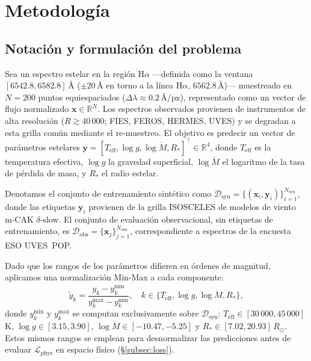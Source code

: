 \documentclass[sigconf,ACM]{acmart}
\begin{document}
\section{Metodología}
\label{sec:metodologia}

\subsection{Notación y formulación del problema}
\label{subsec:formalizacion}

Sea un espectro estelar en la región H$\alpha$ ---definida como la ventana $[6542.8, 6582.8]$\,Å (${\pm}20$\,Å en torno a la línea H$\alpha$, $6562.8$\,Å)--- muestreado en $N=200$ puntos equiespaciados ($\Delta\lambda\approx0.2$\,Å/px), representado como un vector de flujo normalizado $\mathbf{x} \in \mathbb{R}^{N}$. Los espectros observados provienen de instrumentos de alta resolución ($R\gtrsim40\,000$; FIES, FEROS, HERMES, UVES) y se degradan a esta grilla común mediante el re-muestreo. El objetivo es predecir un vector de parámetros estelares $\mathbf{y} = [T_{\mathrm{eff}}, \log g, \log \dot{M}, R_{*}]^{\top} \in \mathbb{R}^{4}$, donde $T_{\mathrm{eff}}$ es la temperatura efectiva, $\log g$ la gravedad superficial, $\log \dot{M}$ el logaritmo de la tasa de pérdida de masa, y $R_{*}$ el radio estelar.

Denotamos el conjunto de entrenamiento sintético como $\mathcal{D}_{\mathrm{syn}} = \{(\mathbf{x}_i, \mathbf{y}_i)\}_{i=1}^{N_{\mathrm{syn}}}$, donde las etiquetas $\mathbf{y}_i$ provienen de la grilla ISOSCELES de modelos de viento m-CAK $\delta$-slow. El conjunto de evaluación observacional, sin etiquetas de entrenamiento, es $\mathcal{D}_{\mathrm{obs}} = \{\mathbf{x}_j\}_{j=1}^{N_{\mathrm{obs}}}$, correspondiente a espectros de la encuesta ESO UVES~POP.

Dado que los rangos de los parámetros difieren en órdenes de magnitud, aplicamos una normalización Min-Max a cada componente:
\begin{equation}
  \tilde{y}_k = \frac{y_k - y_k^{\min}}{y_k^{\max} - y_k^{\min}}, \quad k \in \{T_{\mathrm{eff}}, \log g, \log \dot{M}, R_{*}\},
  \label{eq:minmax}
\end{equation}
donde $y_k^{\min}$ y $y_k^{\max}$ se computan exclusivamente sobre $\mathcal{D}_{\mathrm{syn}}$: $T_{\mathrm{eff}}\in[30\,000,45\,000]$\,K, $\log g\in[3.15,3.90]$, $\log\dot{M}\in[-10.47,-5.25]$ y $R_*\in[7.02,20.93]\,R_\odot$. Estos mismos rangos se emplean para desnormalizar las predicciones antes de evaluar $\mathcal{L}_{\mathrm{phys}}$ en espacio físico (§\ref{subsec:loss}).
\end{document}
